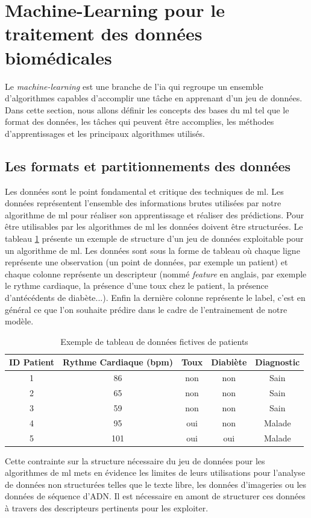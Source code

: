 \section{Machine-Learning pour le traitement des données biomédicales}
Le \textit{machine-learning} est une branche de l'\gls{ia} qui regroupe un ensemble d'algorithmes capables d'accomplir une tâche en apprenant d'un jeu de données. Dans cette section, nous allons définir les concepts des bases du \gls{ml} tel que le format des données, les tâches qui peuvent être accomplies, les méthodes d'apprentissages et les principaux algorithmes utilisés.

\subsection{Les formats et partitionnements des données}
Les données sont le point fondamental et critique des techniques de \gls{ml}. Les données représentent l'ensemble des informations brutes utilisées par notre algorithme de \gls{ml} pour réaliser son apprentissage et réaliser des prédictions. Pour être utilisables par les algorithmes de \gls{ml} les données doivent être structurées. Le tableau \ref{table:dataset_intro} présente un exemple de structure d'un jeu de données exploitable pour un algorithme de \gls{ml}. Les données sont sous la forme de tableau où chaque ligne représente une observation (un point de données, par exemple un patient) et chaque colonne représente un descripteur (nommé \textit{feature} en anglais, par exemple le rythme cardiaque, la présence d'une toux chez le patient, la présence d'antécédents de diabète...). Enfin la dernière colonne représente le label, c'est en général ce que l'on souhaite prédire dans le cadre de l'entrainement de notre modèle.
\begin{table}[h!]
\centering
\begin{tabular}{|c|c|c|c|c|} 
 \hline
 ID Patient & Rythme Cardiaque (bpm) & Toux & Diabiète & Diagnostic \\
 \hline
 1 & 86 & non & non & Sain \\ 
 2 & 65 & non & non & Sain \\ 
 3 & 59 & non & non & Sain \\ 
 4 & 95 & oui & non & Malade \\ 
 5 & 101 & oui & oui & Malade\\ 
 \hline
\end{tabular}
\caption{Exemple de tableau de données fictives de patients}
\label{table:dataset_intro}
\end{table}
Cette contrainte sur la structure nécessaire du jeu de données pour les algorithmes de \gls{ml} mets en évidence les limites de leurs utilisations pour l'analyse de données non structurées telles que le texte libre, les données d'imageries ou les données de séquence d'ADN. Il est nécessaire en amont de structurer ces données à travers des descripteurs pertinents pour les exploiter.


